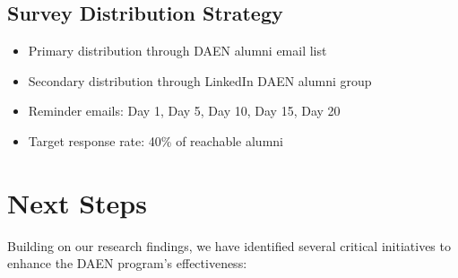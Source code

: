 \documentclass[12pt,a4paper]{article}
\begin{document}
\subsection{Survey Distribution Strategy}
\begin{itemize}
    \item Primary distribution through DAEN alumni email list
    \item Secondary distribution through LinkedIn DAEN alumni group
    \item Reminder emails: Day 1, Day 5, Day 10, Day 15, Day 20
    \item Target response rate: 40\% of reachable alumni
\end{itemize}

\newpage

\section{Next Steps}
Building on our research findings, we have identified several critical initiatives to enhance the DAEN program's effectiveness:
\end{document}
